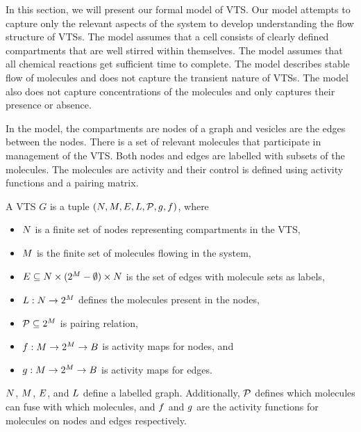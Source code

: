 In this section, we will present our formal model of VTS.
%
Our model attempts to capture only the relevant aspects of the
system to develop understanding the flow structure of VTSs.
%
The model assumes that a cell consists of clearly defined compartments
that are well stirred within themselves.
%
The model assumes that all chemical reactions get sufficient time to complete.
%
The model describes stable flow of molecules and does not
capture the transient nature of VTSs.
%
The model also does not capture concentrations of the molecules and
only captures their presence or absence.
%

In the model, the compartments are nodes of a graph
and vesicles are the edges between the nodes.
%
There is a set of relevant molecules that participate in
management of the VTS.
%
Both nodes and edges are labelled with subsets of the molecules.
%
The molecules are activity and their control is defined using
activity functions and a pairing matrix.
%

\begin{df}
  A VTS $G$ is a tuple $(N,M,E,L,\mathcal{P},g,f)$, where
  \begin{itemize}
  \item $N$ is a finite set of nodes representing compartments in the VTS,
  \item $M$ is the finite set of molecules flowing in the system, 
  \item $E \subseteq N \times (2^{M}-\emptyset) \times N$ is the
    set of edges with molecule sets as labels,
  \item $L : N \rightarrow 2^{M}$ defines the molecules present in the nodes,
  \item $\mathcal{P} \subseteq 2^{M}$ is pairing relation,
  \item $f : M \rightarrow 2^{M} \rightarrow B$ is activity maps for nodes, and
 \item $g : M \rightarrow 2^{M} \rightarrow B$ is activity maps for edges.
  \end{itemize}
\end{df}
$N$, $M$, $E$, and $L$ define a labelled graph.
%
Additionally, $\mathcal{P}$ defines which molecules can fuse with which molecules,
and
$f$ and $g$ are the activity functions for molecules on
nodes and edges respectively.
%

